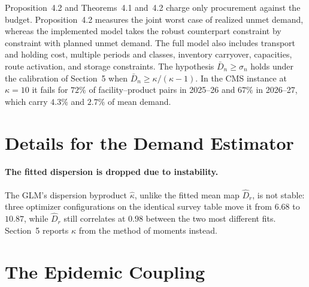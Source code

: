 \documentclass[11pt]{article}
\begin{document}
Proposition~4.2 and Theorems~4.1 and~4.2 charge only procurement against the budget.
Proposition~4.2 measures the joint worst case of realized unmet demand, whereas the implemented model takes the robust counterpart constraint by constraint with planned unmet demand.
The full model also includes transport and holding cost, multiple periods and classes, inventory carryover, capacities, route activation, and storage constraints.
The hypothesis $\bar D_n \ge \sigma_n$ holds under the calibration of Section~5 when $\bar D_n \ge \kappa/(\kappa-1)$.
In the CMS instance at $\kappa = 10$ it fails for $72\%$ of facility--product pairs in 2025--26 and $67\%$ in 2026--27, which carry $4.3\%$ and $2.7\%$ of mean demand.

\section{Details for the Demand Estimator}
\label{ec:proofs}

\paragraph{The fitted dispersion is dropped due to instability.}
\label{ec:kappa-stability}
The GLM's dispersion byproduct $\hat\kappa$, unlike the fitted mean map $\hat D_r$, is not stable: three optimizer configurations on the identical survey table move it from $6.68$ to $10.87$, while $\hat D_r$ still correlates at $0.98$ between the two most different fits.
Section~5 reports $\kappa$ from the method of moments instead.

\section{The Epidemic Coupling}
\label{ec:seir}
\end{document}

